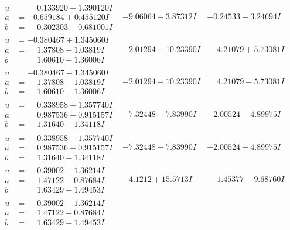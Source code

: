 \documentclass[1p]{elsarticle_modified}
\theoremstyle{definition}
\begin{document}
$$\begin{array}{c|c|c}
\begin{aligned}
u &= \phantom{-}0.133920 - 1.390120 I \\
a &= -0.659184 + 0.455120 I \\
b &= \phantom{-}0.302303 - 0.681001 I\end{aligned}
 & -9.06064 - 3.87312 I & -0.24533 + 3.24694 I \\ \hline\begin{aligned}
u &= -0.380467 + 1.345060 I \\
a &= \phantom{-}1.37808 + 1.03819 I \\
b &= \phantom{-}1.60610 - 1.36006 I\end{aligned}
 & -2.01294 - 10.23390 I & \phantom{-}4.21079 + 5.73081 I \\ \hline\begin{aligned}
u &= -0.380467 - 1.345060 I \\
a &= \phantom{-}1.37808 - 1.03819 I \\
b &= \phantom{-}1.60610 + 1.36006 I\end{aligned}
 & -2.01294 + 10.23390 I & \phantom{-}4.21079 - 5.73081 I \\ \hline\begin{aligned}
u &= \phantom{-}0.338958 + 1.357740 I \\
a &= \phantom{-}0.987536 - 0.915157 I \\
b &= \phantom{-}1.31640 + 1.34118 I\end{aligned}
 & -7.32448 + 7.83990 I & -2.00524 - 4.89975 I \\ \hline\begin{aligned}
u &= \phantom{-}0.338958 - 1.357740 I \\
a &= \phantom{-}0.987536 + 0.915157 I \\
b &= \phantom{-}1.31640 - 1.34118 I\end{aligned}
 & -7.32448 - 7.83990 I & -2.00524 + 4.89975 I \\ \hline\begin{aligned}
u &= \phantom{-}0.39002 + 1.36214 I \\
a &= \phantom{-}1.47122 - 0.87684 I \\
b &= \phantom{-}1.63429 + 1.49453 I\end{aligned}
 & -4.1212 + 15.5713 I & \phantom{-}1.45377 - 9.68760 I \\ \hline\begin{aligned}
u &= \phantom{-}0.39002 - 1.36214 I \\
a &= \phantom{-}1.47122 + 0.87684 I \\
b &= \phantom{-}1.63429 - 1.49453 I\end{aligned}

\end{array}$$
\end{document}
